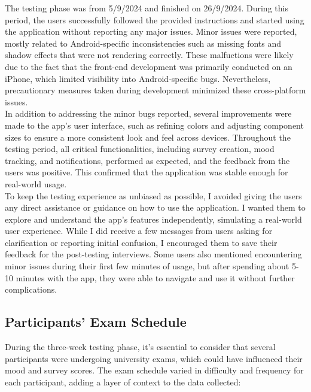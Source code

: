 The testing phase was from 5/9/2024 and finished on 26/9/2024. During this period, the users successfully followed the provided instructions and started using the application without reporting any major issues. Minor issues were reported, mostly related to Android-specific inconsistencies such as missing fonts and shadow effects that were not rendering correctly. These malfuctions were likely due to the fact that the front-end development was primarily conducted on an iPhone, which limited visibility into Android-specific bugs. Nevertheless, precautionary measures taken during development minimized these cross-platform issues.\vspace{5mm} \\
In addition to addressing the minor bugs reported, several improvements were made to the app's user interface, such as refining colors and adjusting component sizes to ensure a more consistent look and feel across devices. Throughout the testing period, all critical functionalities, including survey creation, mood tracking, and notifications, performed as expected, and the feedback from the users was positive. This confirmed that the application was stable enough for real-world usage.\vspace{5mm} \\
To keep the testing experience as unbiased as possible, I avoided giving the users any direct assistance or guidance on how to use the application. I wanted them to explore and understand the app's features independently, simulating a real-world user experience. While I did receive a few messages from users asking for clarification or reporting initial confusion, I encouraged them to save their feedback for the post-testing interviews. Some users also mentioned encountering minor issues during their first few minutes of usage, but after spending about 5-10 minutes with the app, they were able to navigate and use it without further complications.

\subsection{Participants' Exam Schedule}

During the three-week testing phase, it’s essential to consider that several participants were undergoing university exams, which could have influenced their mood and survey scores. The exam schedule varied in difficulty and frequency for each participant, adding a layer of context to the data collected:


